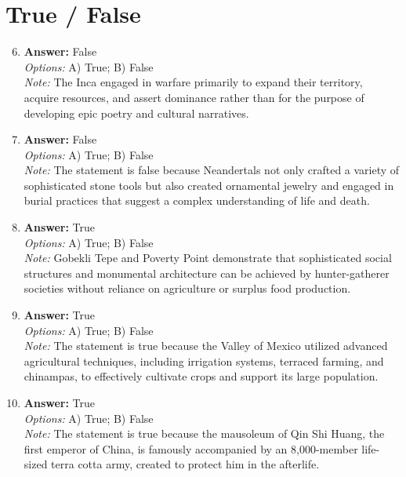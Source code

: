 \documentclass[12pt]{article}
\begin{document}
\section*{True / False}
\begin{enumerate}[label=\arabic*.]
\setcounter{enumi}{5}
\item \textbf{Answer:} False
\\ \textit{Options:} A) True; B) False
\\ \textit{Note:} The Inca engaged in warfare primarily to expand their territory, acquire resources, and assert dominance rather than for the purpose of developing epic poetry and cultural narratives.
\item \textbf{Answer:} False
\\ \textit{Options:} A) True; B) False
\\ \textit{Note:} The statement is false because Neandertals not only crafted a variety of sophisticated stone tools but also created ornamental jewelry and engaged in burial practices that suggest a complex understanding of life and death.
\item \textbf{Answer:} True
\\ \textit{Options:} A) True; B) False
\\ \textit{Note:} Gobekli Tepe and Poverty Point demonstrate that sophisticated social structures and monumental architecture can be achieved by hunter-gatherer societies without reliance on agriculture or surplus food production.
\item \textbf{Answer:} True
\\ \textit{Options:} A) True; B) False
\\ \textit{Note:} The statement is true because the Valley of Mexico utilized advanced agricultural techniques, including irrigation systems, terraced farming, and chinampas, to effectively cultivate crops and support its large population.
\item \textbf{Answer:} True
\\ \textit{Options:} A) True; B) False
\\ \textit{Note:} The statement is true because the mausoleum of Qin Shi Huang, the first emperor of China, is famously accompanied by an 8,000-member life-sized terra cotta army, created to protect him in the afterlife.
\end{enumerate}
\end{document}
